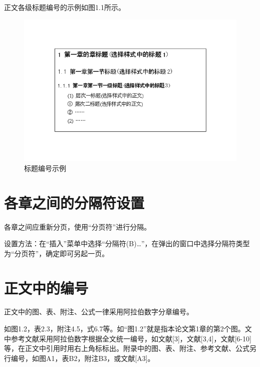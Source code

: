 正文各级标题编号的示例如图1.1所示。
\begin{figure}
	\centering
	\includegraphics[scale = 0.4]{figures/1.1}
	\caption{\song\wuhao 标题编号示例}
\end{figure}

\section{各章之间的分隔符设置}
各章之间应重新分页，使用“分页符”进行分隔。

设置方法：在“插入”菜单中选择“分隔符(B)…”，在弹出的窗口中选择分隔符类型为“分页符”，确定即可另起一页。

\section{正文中的编号}
正文中的图、表、附注、公式一律采用阿拉伯数字分章编号。

如图1.2，表2.3，附注4.5，式6.7等。如“图1.2”就是指本论文第1章的第2个图。文中参考文献采用阿拉伯数字根据全文统一编号，如文献[3]，文献[3,4]，文献[6-10]等，在正文中引用时用右上角标标出。附录中的图、表、附注、参考文献、公式另行编号，如图A1，表B2，附注B3，或文献[A3]。


